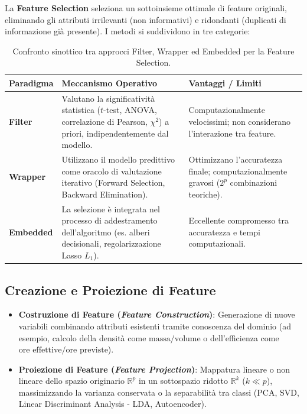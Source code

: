 La \textbf{Feature Selection} seleziona un sottoinsieme ottimale di feature originali, eliminando gli attributi irrilevanti (non informativi) e ridondanti (duplicati di informazione già presente). I metodi si suddividono in tre categorie:

\begin{table}[H]
    \centering
    \small
    \begin{tabularx}{\textwidth}{lXX}
        \toprule
        \textbf{Paradigma} & \textbf{Meccanismo Operativo} & \textbf{Vantaggi / Limiti} \\
        \midrule
        \textbf{Filter} & Valutano la significatività statistica ($t$-test, ANOVA, correlazione di Pearson, $\chi^2$) a priori, indipendentemente dal modello. & Computazionalmente velocissimi; non considerano l'interazione tra feature. \\
        \addlinespace
        \textbf{Wrapper} & Utilizzano il modello predittivo come oracolo di valutazione iterativo (Forward Selection, Backward Elimination). & Ottimizzano l'accuratezza finale; computazionalmente gravosi ($2^p$ combinazioni teoriche). \\
        \addlinespace
        \textbf{Embedded} & La selezione è integrata nel processo di addestramento dell'algoritmo (es. alberi decisionali, regolarizzazione Lasso $L_1$). & Eccellente compromesso tra accuratezza e tempi computazionali. \\
        \bottomrule
    \end{tabularx}
    \caption{Confronto sinottico tra approcci Filter, Wrapper ed Embedded per la Feature Selection.}
    \label{tab:dm-feature-selection-methods}
\end{table}

\FloatBarrier
\subsection{Creazione e Proiezione di Feature}
\begin{itemize}
    \item \textbf{Costruzione di Feature (\textit{Feature Construction})}: Generazione di nuove variabili combinando attributi esistenti tramite conoscenza del dominio (ad esempio, calcolo della densità come $\text{massa}/\text{volume}$ o dell'efficienza come $\text{ore effettive}/\text{ore previste}$).
    \item \textbf{Proiezione di Feature (\textit{Feature Projection})}: Mappatura lineare o non lineare dello spazio originario $\mathbb{R}^p$ in un sottospazio ridotto $\mathbb{R}^k$ ($k \ll p$), massimizzando la varianza conservata o la separabilità tra classi (PCA, SVD, Linear Discriminant Analysis - LDA, Autoencoder).
\end{itemize}

